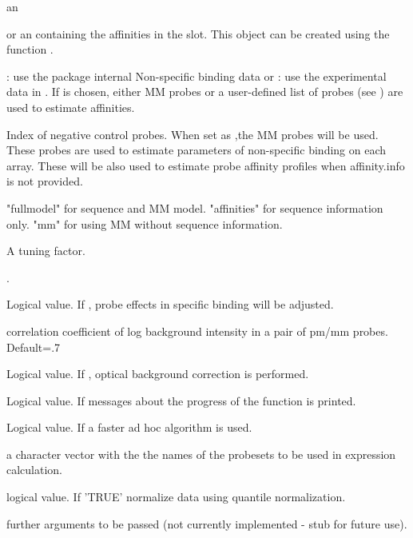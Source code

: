 \begin{Arguments}
\begin{ldescription}
\item[\code{object}] an 
\item[\code{affinity.info}]  or an  containing the
affinities in the  slot. This object can be created
using the function .
\item[\code{affinity.source}] : use the package internal
Non-specific binding data or : use the experimental
data in . If  is chosen, either MM probes or a user-defined
list of probes (see ) are used to estimate
affinities.
\item[\code{NCprobe}] Index of negative control probes. When set as
,the MM probes will be used. These probes
are used to estimate parameters of non-specific binding on each
array. These will be also used to estimate probe affinity profiles when
affinity.info is not provided.
\item[\code{type}] "fullmodel" for sequence and MM model. "affinities" for
sequence information only. "mm" for using MM without sequence
information.
\item[\code{k}] A tuning factor.
\item[\code{stretch}] 
\item[\code{correction}] .
\item[\code{GSB.adjust}] Logical value. If , probe effects in specific binding will
be adjusted.
\item[\code{rho}] correlation coefficient of log background intensity in a pair of pm/mm probes. Default=.7
\item[\code{optical.correct}] Logical value. If , optical
background correction is performed.
\item[\code{verbose}] Logical value. If  messages about the progress of
the function is printed.
\item[\code{fast}] Logical value. If  a faster ad hoc algorithm is
used.
\item[\code{subset}] a character vector with the the names of the probesets to be
used in expression calculation.
\item[\code{normalize}] logical value. If 'TRUE' normalize data using quantile
normalization.
\item[\code{...}] further arguments to be passed (not currently implemented -
stub for future use).
\end{ldescription}
\end{Arguments}
